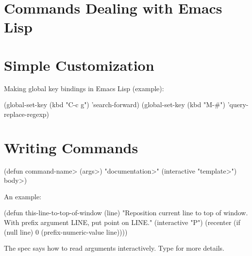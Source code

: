 \section{Commands Dealing with Emacs Lisp}


\section{Simple Customization}



Making global key bindings in Emacs Lisp (example):

\beginexample%
(global-set-key (kbd "C-c g") 'search-forward)
(global-set-key (kbd "M-\#") 'query-replace-regexp)
\endexample

\section{Writing Commands}

\beginexample%
(defun \<command-name> (\<args>)
  "\<documentation>" (interactive "\<template>")
  \<body>)
\endexample

An example:

\beginexample%
(defun this-line-to-top-of-window (line)
  "Reposition current line to top of window.
With prefix argument LINE, put point on LINE."
  (interactive "P")
  (recenter (if (null line)
                0
              (prefix-numeric-value line))))
\endexample

The  spec says how to read arguments interactively.
Type  for more details.

\copyrightnotice

\bye


